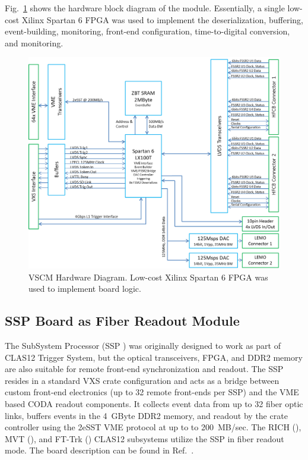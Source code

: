 Fig.~\ref{fig:vscm_blockdiagram} shows the hardware block diagram of the module. Essentially, a single low-cost Xilinx Spartan 6 FPGA was used to implement the deserialization, buffering, event-building, monitoring, front-end configuration, time-to-digital conversion, and monitoring.

\begin{figure}[hbt]
	\centering
	\includegraphics[width=1.0\columnwidth,keepaspectratio]{img/vscm_blockdiagram.png}
	\caption{VSCM Hardware Diagram. Low-cost Xilinx Spartan 6 FPGA was used to implement board logic.}
	\label{fig:vscm_blockdiagram}
\end{figure}


\subsection{SSP Board as Fiber Readout Module}

The SubSystem Processor (SSP \cite{ssp-ref}) was originally designed to work as part of CLAS12 Trigger System, but the optical transceivers, FPGA, and DDR2 memory are also suitable for remote front-end synchronization and readout. The SSP resides in a standard VXS crate configuration and acts as a bridge between custom front-end electronics (up to 32 remote front-ends per SSP) and the VME based CODA readout components. It collects event data from up to 32 fiber optic links, buffers events in the 4~GByte DDR2 memory, and readout by the crate controller using the 2eSST VME protocol at up to to 200~MB/sec. The RICH (\cite{rich-ref}), MVT (\cite{mvt-ref}), and FT-Trk (\cite{ftt-ref}) CLAS12 subsystems utilize the SSP in fiber readout mode. The board description can be found in Ref.~\cite{trig-ref}.

